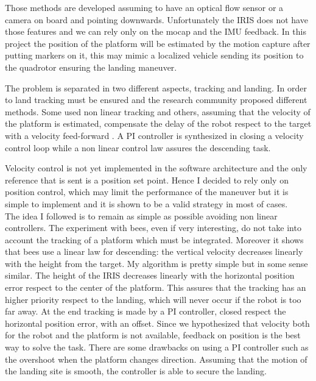 \noindent
Those methods are developed assuming to have an optical flow sensor or a camera on board and pointing downwards. Unfortunately the IRIS does not have those features and we can rely only on the mocap and the IMU feedback. 
In this project the position of the platform will be estimated by the motion capture after putting markers on it, this may mimic a localized vehicle sending its position to the quadrotor ensuring the landing maneuver. \par The problem is separated in two different aspects, tracking and landing. In order to land tracking must be ensured and the research community proposed different methods. Some used non linear tracking \cite{Holger2008} and others, assuming that the velocity of the platform is estimated, compensate the delay of the robot respect to the target with a velocity feed-forward \cite{Friis2009}. A PI controller is synthesized in \cite{Herisse2010} closing a velocity control loop while a non linear control law assures the descending task. \par
Velocity control is not yet implemented in the software architecture and the only reference that is sent is a position set point. Hence I decided to rely only on position control, which may limit the performance of the maneuver but it is simple to implement and it is shown to be a valid strategy in most of cases. \\
\noindent
The idea I followed is to remain as simple as possible avoiding non linear controllers. The experiment with bees, even if very interesting, do not take into account the tracking of a platform which must be integrated. Moreover it shows that bees use a linear law for descending: the vertical velocity decreases linearly with the height from the target. My algorithm is pretty simple but in some sense similar. The height of the IRIS decreases linearly with the horizontal position error respect to the center of the platform. This assures that the tracking has an higher priority respect to the landing, which will never occur if the robot is too far away. At the end tracking is made by a PI controller, closed respect the horizontal position error, with an offset. Since we hypothesized that velocity both for the robot and the platform is not available, feedback on position is the best way to solve the task. There are some drawbacks on using a PI controller such as the overshoot when the platform changes direction. Assuming that the motion of the landing site is smooth, the controller is able to secure the landing. 




























